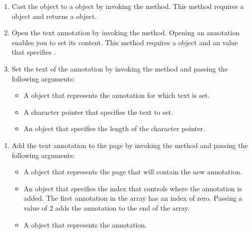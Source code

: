 \documentclass[letterpaper,12pt,english,openany,oneside]{sphinxmanual}
\begin{document}
\begin{enumerate}
%
\setcounter{enumi}{4}
\item {} 
Cast the  object to a  object by invoking the  method. This method requires a  object and returns a  object.

\item {} 
Open the text annotation by invoking the  method. Opening an annotation enables you to set its content. This method requires a  object and an  value that specifies .

\item {} 
Set the text of the annotation by invoking the  method and passing the following arguments:
\begin{itemize}
\item {} 
A  object that represents the annotation for which text is set.

\item {} 
A character pointer that specifies the text to set.

\item {} 
An  object that specifies the length of the character pointer.

\end{itemize}

\end{enumerate}
\begin{enumerate}
%
\setcounter{enumi}{7}
\item {} 
Add the text annotation to the page by invoking the  method and passing the following arguments:
\begin{itemize}
\item {} 
A  object that represents the page that will contain the new annotation.

\item {} 
An  object that specifies the index that controls where the annotation is added. The first annotation in the array has an index of zero. Passing a value of \sphinxhyphen{}2 adds the annotation to the end of the array.

\item {} 
A  object that represents the annotation.

\end{itemize}

\end{enumerate}
\end{document}
